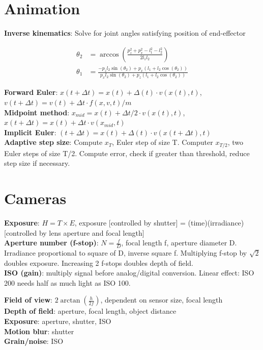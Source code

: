 \documentclass[9pt,landscape]{extarticle}
\begin{document}
\begin{multicols}{3}

\section{Animation}

\textbf{Inverse kinematics}: Solve for joint angles satisfying position of end-effector

\begin{align*}
\theta_2 &= \arccos\left(\frac{p_z^2 + p_x^2 - l_1^2 - l_2^2}{2l_1l_2}\right) \\
\theta_1 &= \frac{-p_zl_2\sin(\theta_2) + p_x(l_1 + l_2\cos(\theta_2))}{p_xl_2\sin(\theta_2) + p_z(l_1 + l_2\cos(\theta_2))}
\end{align*}

\textbf{Forward Euler}: $x(t + \Delta t) = x(t) + \Delta(t) \cdot v(x(t), t)$, $v(t + \Delta t) = v(t) + \Delta t \cdot f(x, v, t) / m$ \\
\textbf{Midpoint method}: $x_{mid} = x(t) + \Delta t / 2 \cdot v(x(t), t)$, $x(t + \Delta t) = x(t) + \Delta t \cdot v(x_{mid}, t)$ \\
\textbf{Implicit Euler}: $(t + \Delta t) = x(t) + \Delta(t) \cdot v(x(t + \Delta t), t)$ \\
\textbf{Adaptive step size}: Compute $x_T$, Euler step of size T. Computer $x_{T/2}$, two Euler steps of size T/2. Compute error, check if greater than threshold, reduce step size if necessary.



\section{Cameras}

\textbf{Exposure}: $H = T \times E$, exposure [controlled by shutter] = (time)(irradiance) [controlled by lens aperture and focal length] \\
\textbf{Aperture number (f-stop)}: $N = \frac{f}{D}$, focal length f, aperture diameter D. Irradiance proportional to square of D, inverse square f. Multiplying f-stop by $\sqrt{2}$ doubles exposure. Increasing 2 f-stops doubles depth of field. \\
\textbf{ISO (gain)}: multiply signal before analog/digital conversion. Linear effect: ISO 200 needs half as much light as ISO 100.

\textbf{Field of view}: $2\arctan(\frac{h}{2f})$, dependent on sensor size, focal length \\
\textbf{Depth of field}: aperture, focal length, object distance \\
\textbf{Exposure}: aperture, shutter, ISO \\
\textbf{Motion blur}: shutter \\
\textbf{Grain/noise}: ISO


\end{multicols}
\end{document}
